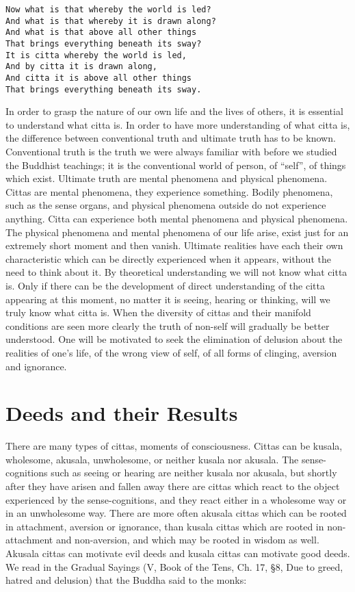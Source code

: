 \documentclass{book}
\begin{document}
\begin{verbatim}
Now what is that whereby the world is led?
And what is that whereby it is drawn along?
And what is that above all other things
That brings everything beneath its sway?
It is citta whereby the world is led,
And by citta it is drawn along,
And citta it is above all other things
That brings everything beneath its sway.
\end{verbatim}

In order to grasp the nature of our own life and the lives of others, it
is essential to understand what citta is. In order to have more
understanding of what citta is, the difference between conventional
truth and ultimate truth has to be known. Conventional truth is the
truth we were always familiar with before we studied the Buddhist
teachings; it is the conventional world of person, of ``self'', of
things which exist. Ultimate truth are mental phenomena and physical
phenomena. Cittas are mental phenomena, they experience something.
Bodily phenomena, such as the sense organs, and physical phenomena
outside do not experience anything. Citta can experience both mental
phenomena and physical phenomena. The physical phenomena and mental
phenomena of our life arise, exist just for an extremely short moment
and then vanish. Ultimate realities have each their own characteristic
which can be directly experienced when it appears, without the need to
think about it. By theoretical understanding we will not know what citta
is. Only if there can be the devel­op­ment of direct understanding of
the citta appearing at this moment, no matter it is seeing, hearing or
thinking, will we truly know what citta is. When the diversity of cittas
and their manifold conditions are seen more clearly the truth of
non-self will gradually be better understood. One will be motivated to
seek the elimination of delusion about the realities of one's life, of
the wrong view of self, of all forms of clinging, aversion and
ignorance.

\chapter{Deeds and their Results}

There are many types of cittas, moments of consciousness. Cittas can be
kusala, wholesome, akusala, unwholesome, or neither kusala nor akusala.
The sense-cognitions such as seeing or hearing are neither kusala nor
akusala, but shortly after they have arisen and fallen away there are
cittas which react to the object experienced by the sense-cognitions,
and they react either in a wholesome way or in an unwholesome way. There
are more often akusala cittas which can be rooted in attachment,
aversion or ignorance, than kusala cittas which are rooted in
non-attachment and non-aversion, and which may be rooted in wisdom as
well. Akusala cittas can motivate evil deeds and kusala cittas can
motivate good deeds. We read in the Gradual Sayings (V, Book of the
Tens, Ch. 17, §8, Due to greed, hatred and delusion) that the Buddha
said to the monks:
\end{document}
